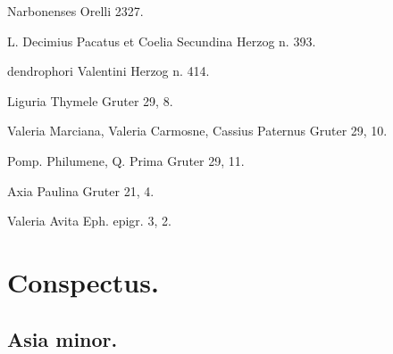 \documentclass[a4paper, 11pt, oneside, polutonikogreek, german, twocolumn]{article}
\begin{document}
Narbonenses Orelli 2327.

L. Decimius Pacatus et Coelia Secundina Herzog n. 393.

dendrophori Valentini Herzog n. 414.

Liguria Thymele Gruter 29, 8.

Valeria Marciana, Valeria Carmosne, Cassius Paternus Gruter 29, 10.

Pomp. Philumene, Q. Prima Gruter 29, 11.

Axia Paulina Gruter 21, 4.

Valeria Avita Eph. epigr. 3, 2.
\clearpage
\onecolumn
\section{Conspectus.}
\subsection{Asia minor.}
\end{document}
